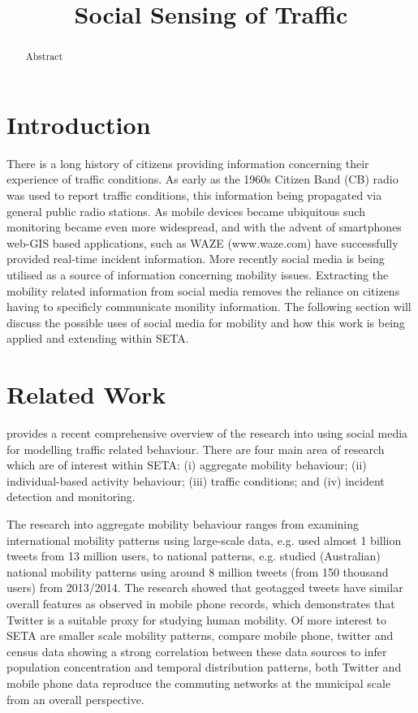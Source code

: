 \documentclass{article}
\begin{document}
\title{Social Sensing of Traffic}

\maketitle

\begin{abstract}

Abstract

\end{abstract}

\section{Introduction}

There is a long history of citizens providing information concerning their experience of traffic conditions. As early as the 1960s Citizen Band (CB) radio was used to report traffic conditions, this information being propagated via general public radio stations. As mobile devices became ubiquitous such monitoring became even more widespread, and with the advent of smartphones web-GIS based applications, such as WAZE (www.waze.com) have successfully provided real-time incident information. More recently social media is being utilised as a source of information concerning mobility issues. Extracting the mobility related information from social media removes the reliance on citizens having to specificly communicate monility information. The following section will discuss the possible uses of social media for mobility and how this work is being applied and extending within SETA.

\section{Related Work}

\cite{rashidi2017exploring} provides a recent comprehensive overview of the research into using social media for modelling traffic related behaviour. There are four main area of research which are of interest within SETA: (i) aggregate mobility behaviour; (ii) individual-based activity behaviour; (iii) traffic conditions; and (iv) incident detection and monitoring.

The research into aggregate mobility behaviour ranges from examining international mobility patterns using large-scale data, e.g. \cite{hawelka2014geo} used almost 1 billion tweets from 13 million users, to national patterns, e.g. \cite{jurdak2015understanding} studied (Australian) national mobility patterns using around 8 million tweets (from 150 thousand users) from 2013/2014. The research showed that geotagged tweets have similar overall features as observed in mobile phone records, which demonstrates that Twitter is a suitable proxy for studying human mobility. Of more interest to SETA are smaller scale mobility patterns, \cite{lenormand2014cross} compare mobile phone, twitter and census data showing a strong correlation between these data sources to infer population concentration and temporal distribution patterns, both Twitter and mobile phone data reproduce the commuting networks at the municipal scale from an overall perspective. 
\end{document}
